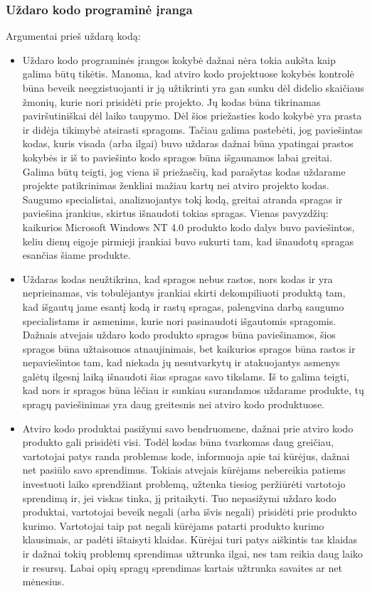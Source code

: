 \documentclass[a4paper,12pt,fleqn]{article}
\begin{document}
\subsubsection{Uždaro kodo programinė įranga}
\label{sec:data}
Argumentai prieš uždarą kodą:
\begin{itemize}
	\item Uždaro kodo programinės įrangos kokybė dažnai nėra tokia aukšta kaip galima būtų tikėtis. Manoma, kad atviro kodo projektuose kokybės kontrolė būna beveik neegzistuojanti ir ją užtikrinti yra gan sunku dėl didelio skaičiaus žmonių, kurie nori prisidėti prie projekto. Jų kodas būna tikrinamas paviršutiniškai dėl laiko taupymo. Dėl šios priežasties kodo kokybė yra prasta ir didėja tikimybė atsirasti spragoms. Tačiau galima pastebėti, jog paviešintas kodas, kuris visada (arba ilgai) buvo uždaras dažnai būna ypatingai prastos kokybės ir iš to paviešinto kodo spragos būna išgaunamos labai greitai. Galima būtų teigti, jog viena iš priežasčių, kad parašytas kodas uždarame projekte patikrinimas ženkliai mažiau kartų nei atviro projekto kodas. Saugumo specialistai, analizuojantys tokį kodą, greitai atranda spragas ir paviešina įrankius, skirtus išnaudoti tokias spragas. Vienas pavyzdžių: kaikurios Microsoft Windows NT 4.0 produkto kodo dalys buvo paviešintos, keliu dienų eigoje pirmieji įrankiai buvo sukurti tam, kad išnaudotų spragas esančias šiame produkte\cite{hoepman2008increased}. 
	\item Uždaras kodas neužtikrina, kad spragos nebus rastos, nors kodas ir yra neprieinamas, vis tobulėjantys įrankiai skirti dekompiliuoti produktą tam, kad išgautų jame esantį kodą ir rastų spragas, palengvina darbą saugumo specialistams ir asmenims, kurie nori pasinaudoti išgautomis spragomis. Dažnais atvejais uždaro kodo produkto spragos būna paviešinamos, šios spragos būna užtaisomos atnaujinimais, bet kaikurios spragos būna rastos ir nepaviešintos tam, kad niekada jų nesutvarkytų ir atakuojantys asmenys galėtų ilgesnį laiką išnaudoti šias spragas savo tikslams. Iš to galima teigti, kad nors ir spragos būna lėčiau ir sunkiau surandamos uždarame produkte, tų spragų paviešinimas yra daug greitesnis nei atviro kodo produktuose\cite{mishra2002quality}. 
	\item Atviro kodo produktai pasižymi savo bendruomene, dažnai prie atviro kodo produkto gali prisidėti visi. Todėl kodas būna tvarkomas daug greičiau, vartotojai patys randa problemas kode, informuoja apie tai kūrėjus, dažnai net pasiūlo savo sprendimus. Tokiais atvejais kūrėjams nebereikia patiems investuoti laiko sprendžiant problemą, užtenka tiesiog peržiūrėti vartotojo sprendimą ir, jei viskas tinka, jį pritaikyti. Tuo nepasižymi uždaro kodo produktai, vartotojai beveik negali (arba išvis negali) prisidėti prie produkto kurimo. Vartotojai taip pat negali kūrėjams patarti produkto kurimo klausimais, ar padėti ištaisyti klaidas. Kūrėjai turi patys aiškintis tas klaidas ir dažnai tokių problemų sprendimas užtrunka ilgai, nes tam reikia daug laiko ir resursų. Labai opių spragų sprendimas kartais užtrunka savaites ar net mėnesius\cite{hoepman2008increased}. 
\end{itemize}
\end{document}
